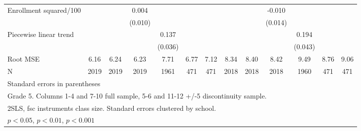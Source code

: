 {\begin{tabular}{l*{12}{c}}
\addlinespace
Enrollment squared/100&                     &                     &       0.004         &                     &                     &                     &                     &                     &      -0.010         &                     &                     &                     \\
            &                     &                     &     (0.010)         &                     &                     &                     &                     &                     &     (0.014)         &                     &                     &                     \\
\addlinespace
Piecewise linear trend&                     &                     &                     &       0.137\sym{***}&                     &                     &                     &                     &                     &       0.194\sym{***}&                     &                     \\
            &                     &                     &                     &     (0.036)         &                     &                     &                     &                     &                     &     (0.043)         &                     &                     \\
\midrule
Root MSE    &        6.16         &        6.24         &        6.23         &        7.71         &        6.77         &        7.12         &        8.34         &        8.40         &        8.42         &        9.49         &        8.76         &        9.06         \\
N           &        2019         &        2019         &        2019         &        1961         &         471         &         471         &        2018         &        2018         &        2018         &        1960         &         471         &         471         \\
\bottomrule
\multicolumn{13}{l}{\footnotesize Standard errors in parentheses}\\
\multicolumn{13}{l}{\footnotesize Grade 5. Columns 1-4 and 7-10 full sample, 5-6 and 11-12 +/-5 discontinuity sample.}\\
\multicolumn{13}{l}{\footnotesize 2SLS, fsc instruments class size. Standard errors clustered by school.}\\
\multicolumn{13}{l}{\footnotesize \sym{*} \(p<0.05\), \sym{**} \(p<0.01\), \sym{***} \(p<0.001\)}\\
\end{tabular}
}
